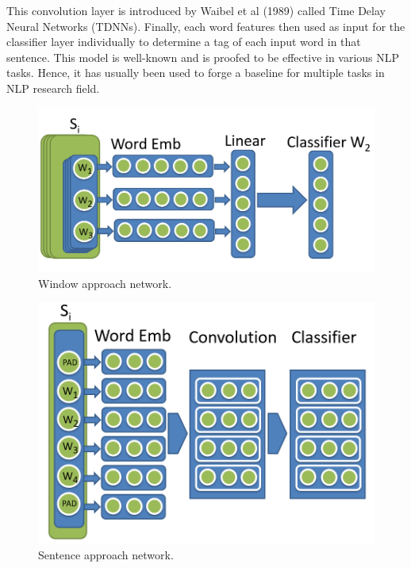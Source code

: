 This convolution layer is introduced by Waibel et al (1989) \cite{Waibel1989PhonemeRU} called Time Delay Neural Networks (TDNNs).
Finally, each word features then used as input for the classifier layer individually to determine a tag of each input word in that sentence. 
This model is well-known and is proofed to be effective in various NLP tasks. 
Hence, it has usually been used to forge a baseline for multiple tasks in NLP research field.
\begin{figure}[!h]
\centering
  \includegraphics[scale=0.5]{window_approach_network.png}
  \caption{Window approach network.}
  \label{fig:window_approach_network}
\end{figure}
\begin{figure}[!h]
\centering
  \includegraphics[scale=0.5]{sentence_approach_network.png}
  \caption{Sentence approach network.}
  \label{fig:sentence_approach_network}
\end{figure}



